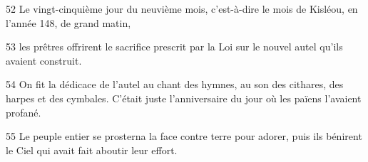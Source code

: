 52 Le vingt-cinquième jour du neuvième mois, c’est-à-dire le mois de Kisléou, en l’année 148, de grand matin,

53 les prêtres offrirent le sacrifice prescrit par la Loi sur le nouvel autel qu’ils avaient construit.

54 On fit la dédicace de l’autel au chant des hymnes, au son des cithares, des harpes et des cymbales. C’était juste l’anniversaire du jour où les païens l’avaient profané.

55 Le peuple entier se prosterna la face contre terre pour adorer, puis ils bénirent le Ciel qui avait fait aboutir leur effort.
